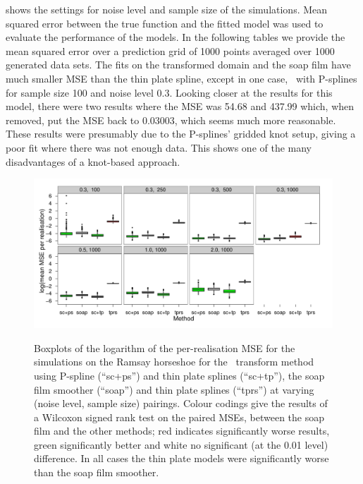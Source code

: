  shows the settings for noise level and sample size of the simulations. Mean squared error between the true function and the fitted model was used to evaluate the performance of the models. In the following tables we provide the mean squared error over a prediction grid of 1000 points averaged over 1000 generated data sets. The fits on the transformed domain and the soap film have much smaller MSE than the thin plate spline, except in one case, \sch\ with P-splines for sample size 100 and noise level 0.3. Looking closer at the results for this model, there were two results where the MSE was 54.68 and 437.99 which, when removed, put the MSE back to 0.03003, which seems much more reasonable. These results were presumably due to the P-splines' gridded knot setup, giving a poor fit where there was not enough data. This shows one of the many disadvantages of a knot-based approach.

\begin{figure}
\centering
\includegraphics{sc/tablecode/ramsay-boxplot.pdf} \\
\caption{Boxplots of the logarithm of the per-realisation MSE for the simulations on the Ramsay horseshoe for the \sch\ transform method using P-spline (``sc+ps'') and thin plate splines (``sc+tp''), the soap film smoother (``soap'') and thin plate splines (``tprs'') at varying (noise level, sample size) pairings. Colour codings give the results of a Wilcoxon signed rank test on the paired MSEs, between the soap film and the other methods; red indicates significantly worse results, green significantly better and white no significant (at the 0.01 level) difference. In all cases the thin plate models were significantly worse than the soap film smoother.}
\label{sc-ram-boxplot}
\end{figure}


